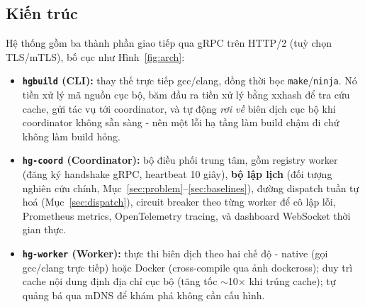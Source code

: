 \documentclass[final,5p,times,twocolumn]{elsarticle}
\begin{document}
\subsection{Kiến trúc}

Hệ thống gồm ba thành phần giao tiếp qua gRPC trên HTTP/2 (tuỳ chọn TLS/mTLS), bố cục như Hình~\ref{fig:arch}:

\begin{itemize}
\item \textbf{\texttt{hgbuild} (CLI):} thay thế trực tiếp gcc/clang, đồng thời bọc \texttt{make}/\texttt{ninja}. Nó tiền xử lý mã nguồn cục bộ, băm đầu ra tiền xử lý bằng xxhash để tra cứu cache, gửi tác vụ tới coordinator, và tự động \emph{rơi về} biên dịch cục bộ khi coordinator không sẵn sàng - nên một lỗi hạ tầng làm build chậm đi chứ không làm build hỏng.
\item \textbf{\texttt{hg-coord} (Coordinator):} bộ điều phối trung tâm, gồm registry worker (đăng ký handshake gRPC, heartbeat 10 giây), \textbf{bộ lập lịch} (đối tượng nghiên cứu chính, Mục~\ref{sec:problem}--\ref{sec:baselines}), đường dispatch tuần tự hoá (Mục~\ref{sec:dispatch}), circuit breaker theo từng worker để cô lập lỗi, Prometheus metrics, OpenTelemetry tracing, và dashboard WebSocket thời gian thực.
\item \textbf{\texttt{hg-worker} (Worker):} thực thi biên dịch theo hai chế độ - native (gọi gcc/clang trực tiếp) hoặc Docker (cross-compile qua ảnh dockcross); duy trì cache nội dung định địa chỉ cục bộ (tăng tốc $\sim$10$\times$ khi trúng cache); tự quảng bá qua mDNS để khám phá không cần cấu hình.
\end{itemize}
\end{document}
